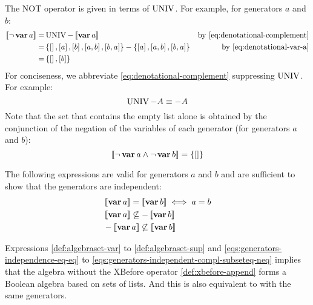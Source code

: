 The \ac{NOT} operator is given in terms of $\operatorname{UNIV}$.
For example, for generators $a$ and $b$:
\begin{align}
\denote{\lnot \var{a}} = & \UNIV - \denote{\var{a}} & \text{by \cref{eq:denotational-complement}}\nonumber\\
= & \left\{ \listsin{}, \listsin{a}, \listsin{b}, \listsin{a,b}, \listsin{b,a} \right\} - \left\{\listsin{a}, \listsin{a,b}, \listsin{b,a}\right\} & \text{by \cref{eq:denotational-var-a}} \nonumber\\
= & \left\{\listsin{}, \listsin{b}\right\}
\end{align}
%
For conciseness, we abbreviate \cref{eq:denotational-complement} suppressing $\operatorname{UNIV}$. 
For example:
\[
\operatorname{UNIV} - A \equiv -A
\]
%
Note that the set that contains the empty list alone is obtained by the conjunction of the negation of the variables of each generator (for generators $a$ and $b$): 
\[\left[\!\left[\lnot \operatorname{\mathbf{var}} a \land \lnot \operatorname{\mathbf{var}} b\right]\!\right] = \left\{[]\right\}
\]

The following expressions are valid for generators $a$ and $b$ and are sufficient to show that the generators are independent:
%
\begin{subequations}
\label{eqs:generators-independence}
\begin{align}
&\denote{\var{a}} = \denote{\var{b}} \iff a = b\label{eqs:generators-independence-eq-eq}\\
&\denote{\var{a}} \not\subseteq - \denote{\var{b}}\\
&- \denote{\var{a}} \not\subseteq \denote{\var{b}}\label{eqs:generators-independent-compl-subseteq-neq}
\end{align}
\end{subequations}

Expressions \cref{def:algebraset-var} to \cref{def:algebraset-sup} and \cref{eqs:generators-independence-eq-eq} to \cref{eqs:generators-independent-compl-subseteq-neq} implies that the \ac{algebra} without the \ac{XBefore} operator \cref{def:xbefore-append} forms a Boolean algebra based on sets of lists.
And this is also equivalent to  with the same generators.


